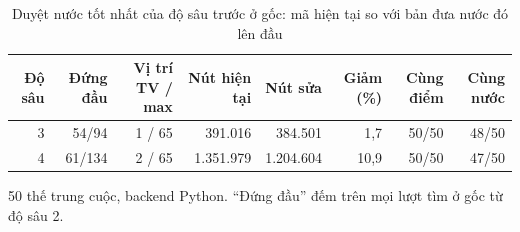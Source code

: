 \begin{table}[H]
  \centering
  \footnotesize
  \caption{Duyệt nước tốt nhất của độ sâu trước ở gốc: mã hiện tại so với bản đưa nước đó lên đầu}
  \label{tab:cs-goc}
  \begin{tabular}{rrrrrrrr}
    \toprule
    Độ sâu & Đứng đầu & Vị trí TV / max & Nút hiện tại & Nút sửa & Giảm (\%) & Cùng điểm & Cùng nước \\
    \midrule
    3 & 54/94 & 1 / 65 & 391.016 & 384.501 & 1,7 & 50/50 & 48/50 \\
    4 & 61/134 & 2 / 65 & 1.351.979 & 1.204.604 & 10,9 & 50/50 & 47/50 \\
    \bottomrule
  \end{tabular}
  \par\smallskip\parbox{.95\linewidth}{\footnotesize 50 thế trung cuộc, backend Python. ``Đứng đầu'' đếm trên mọi lượt tìm ở gốc từ độ sâu 2.}
\end{table}
